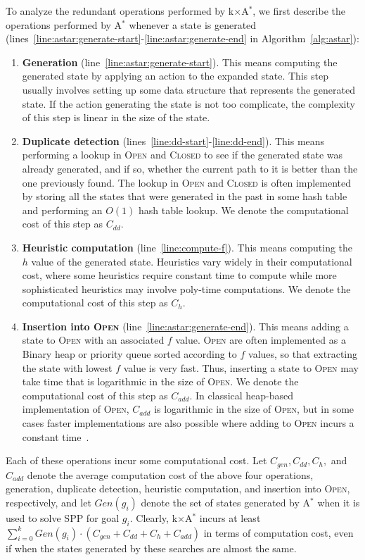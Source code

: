 \documentclass{aicom2e}
\newcommand{\astar}{A$^*$}
\newcommand{\kxastar}{k$\times$A$^*$}
\newcommand{\open}{\textsc{Open}}
\newcommand{\closed}{\textsc{Closed}}
\begin{document}
To analyze the redundant operations performed by \kxastar{}, we first describe the operations performed by \astar{} whenever a state is generated (lines~\ref{line:astar:generate-start}-\ref{line:astar:generate-end} in Algorithm~\ref{alg:astar}):
\begin{enumerate}
\item {\bf Generation}  (line~\ref{line:astar:generate-start}). This means computing the generated state by applying 
an action to the expanded state. This step usually involves setting up some data structure that represents the generated state. If the action generating the state is not too complicate, the complexity of this step is linear in the size of the state. 
\item {\bf Duplicate detection}  (lines~\ref{line:dd-start}-\ref{line:dd-end}). This means performing a lookup in \open{} and \closed{} to see if the generated state was already generated, and if so, whether the current path to it is better than the one previously found. The lookup in \open{} and \closed{} is often implemented by storing all the states that were generated in the past in some hash table and performing an $O(1)$ hash table lookup. We denote the computational cost of this step as $C_{dd}$. 
\item {\bf Heuristic computation}  (line~\ref{line:compute-f}). This means computing the $h$ value of the generated state. Heuristics vary widely in their computational cost, where some heuristics require constant time to compute while more sophisticated heuristics may involve poly-time computations. We denote the computational cost of this step as $C_{h}$. 
\item {\bf Insertion into \open{}}  (line~\ref{line:astar:generate-end}). This means adding a state to \open{} with an associated $f$ value. \open{} are often implemented as a Binary heap or priority queue sorted according to $f$ values, so that extracting the state with lowest $f$ value is very fast. Thus, inserting a state to \open{} may take time that is logarithmic in the size of \open{}. We denote the computational cost of this step as $C_{add}$. In classical heap-based implementation of \open{}, $C_{add}$ is logarithmic in the size of \open{}, but in some cases faster implementations are also possible where adding to \open{} incurs a constant time~\cite{GILON2016,BurnsHLR12}.
\end{enumerate}
Each of these operations incur some computational cost. Let $C_{gen}, C_{dd}, C_{h},$ and $C_{add}$ denote the average computation cost 
of the above four operations, generation, duplicate detection, heuristic computation, and insertion into \open{}, respectively, 
and let $Gen(g_i)$ denote the set of states generated by \astar{} when it is used to solve SPP for goal $g_i$.  
Clearly, \kxastar{} incurs at least $\sum_{i=0}^k Gen(g_i)\cdot(C_{gen}+C_{dd}+C_{h}+C_{add})$ in terms of computation cost, 
even if when the states generated by these searches are almost the same. 
\end{document}
